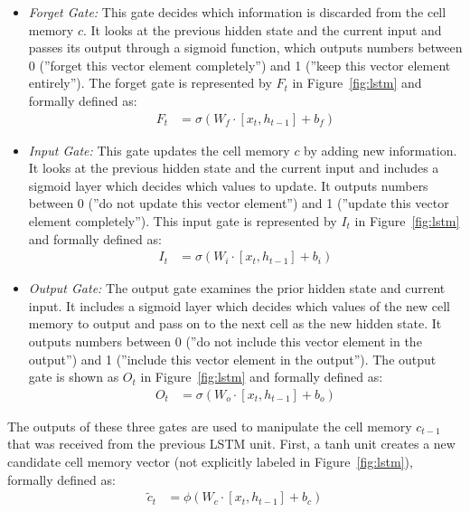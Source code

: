 \begin{itemize}
\item \emph{Forget Gate:} This gate decides which information is discarded from the cell memory $c$. It looks at the previous hidden state and the current input and passes its output through a sigmoid function, which outputs numbers between 0 (''forget this vector element completely'') and 1 (''keep this vector element entirely''). The forget gate is represented by $F_t$ in Figure~\ref{fig:lstm} and formally defined as:
\begin{align}
F_t &= \sigma (W_f \cdot [ x_t, h_{t-1}] + b_f) \label{eq:forget}
\end{align}
\item \emph{Input Gate:} This gate updates the cell memory $c$ by adding new information. It looks at the previous hidden state and the current input and includes a sigmoid layer which decides which values to update. It outputs numbers between 0 (''do not update this vector element'') and 1 (''update this vector element completely''). This input gate is represented by $I_t$ in Figure~\ref{fig:lstm} and formally defined as:
\begin{align}
I_t &= \sigma (W_i \cdot [ x_t, h_{t-1}] + b_i) \label{eq:input}
\end{align}
\item \emph{Output Gate:} The output gate examines the prior hidden state and current input. It includes a sigmoid layer which decides which values of the new cell memory to output and pass on to the next cell as the new hidden state. It outputs numbers between 0 (''do not include this vector element in the output'') and 1 (''include this vector element in the output''). The output gate is shown as $O_t$ in Figure~\ref{fig:lstm} and formally defined as:
\begin{align}
O_t &= \sigma (W_o \cdot [ x_t, h_{t-1}] + b_o) \label{eq:output}
\end{align}
\end{itemize}

The outputs of these three gates are used to manipulate the cell memory $c_{t-1}$ that was received from the previous LSTM unit. First, a tanh unit creates a new candidate cell memory vector (not explicitly labeled in Figure~\ref{fig:lstm}), formally defined as:
\begin{align}
\tilde{c}_t &= \phi (W_c \cdot [ x_t, h_{t-1}] + b_c) \label{eq:candidate}
\end{align}

